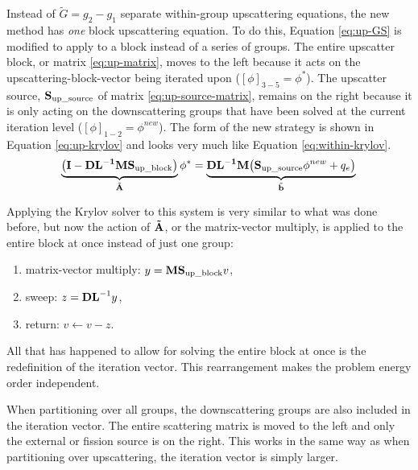Instead of $\tilde{G} = g_{2 }- g_{1}$ separate within-group upscattering equations, the new method has \emph{one} block upscattering equation. To do this, Equation \eqref{eq:up-GS} is modified to apply to a block instead of a series of groups. The entire upscatter block, or matrix \eqref{eq:up-matrix}, moves to the left because it acts on the upscattering-block-vector being iterated upon ($[\phi]_{3-5} = \phi^{*}$). The upscatter source, $\mathbf{S}_{\text{up\_source}}$ of matrix \eqref{eq:up-source-matrix}, remains on the right because it is only acting on the downscattering groups that have been solved at the current iteration level ($[\phi]_{1-2} = \phi^{new}$). The form of the new strategy is shown in Equation \eqref{eq:up-krylov} and looks very much like Equation \eqref{eq:within-krylov}.
%
\begin{equation}
 \underbrace{ \bigl( \mathbf{I} - \mathbf{DL^{-1}}\mathbf{M}\mathbf{S}_{\text{up\_block}} \bigr)}_{\tilde{\mathbf{A}}} \phi^{*} = \underbrace{ \mathbf{DL^{-1}}\mathbf{M} \bigl( \mathbf{S}_{\text{up\_source}}\phi^{new} + q_{e} \bigr)}_{\tilde{\mathbf{b}}}  \label{eq:up-krylov} \\
\end{equation}

Applying the Krylov solver to this system is very similar to what was done before, but now the action of $\mathbf{\tilde{A}}$, or the matrix-vector multiply, is applied to the entire block at once instead of just one group:
%
\begin{enumerate}
  \item matrix-vector multiply: $y = \mathbf{M}\mathbf{S}_{\text{up\_block}} v$,
  \item sweep: $z = \mathbf{DL}^{-1} y$,
  \item return: $v \leftarrow v - z$.
\end{enumerate}
%
All that has happened to allow for solving the entire block at once is the redefinition of the iteration vector. This rearrangement makes the problem energy order independent. 

When partitioning over all groups, the downscattering groups are also included in the iteration vector. The entire scattering matrix is moved to the left and only the external or fission source is on the right. This works in the same way as when partitioning over upscattering, the iteration vector is simply larger.

